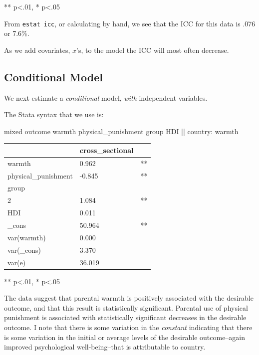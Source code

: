 \documentclass[
  letterpaper,
  DIV=11,
  numbers=noendperiod]{scrreprt}
\newenvironment{Shaded}{\begin{snugshade}}{\end{snugshade}}
\newcommand{\FunctionTok}[1]{\textcolor[rgb]{0.28,0.35,0.67}{#1}}
\newcommand{\NormalTok}[1]{\textcolor[rgb]{0.00,0.23,0.31}{#1}}
\begin{document}
** p\textless.01, * p\textless.05

From \texttt{estat\ icc}, or calculating by hand, we see that the ICC
for this data is .076 or 7.6\%.

As we add covariates, \(x\)'s, to the model the ICC will most often
decrease.

\subsection{Conditional Model}\label{conditional-model}

We next estimate a \emph{conditional} model, \emph{with} independent
variables.

The Stata syntax that we use is:

\begin{Shaded}
\begin{Highlighting}[]

\NormalTok{mixed outcome warmth physical\_punishment }\FunctionTok{group}\NormalTok{ HDI || country: warmth}
\end{Highlighting}
\end{Shaded}

\begin{longtable}[]{@{}lll@{}}
\toprule\noalign{}
& cross\_sectional & \\
\midrule\noalign{}
\endhead
\bottomrule\noalign{}
\endlastfoot
warmth & 0.962 & ** \\
physical\_punishment & -0.845 & ** \\
group & & \\
2 & 1.084 & ** \\
HDI & 0.011 & \\
\_cons & 50.964 & ** \\
var(warmth) & 0.000 & \\
var(\_cons) & 3.370 & \\
var(e) & 36.019 & \\
\end{longtable}

** p\textless.01, * p\textless.05

The data suggest that parental warmth is positively associated with the
desirable outcome, and that this result is statistically significant.
Parental use of physical punishment is associated with statistically
significant decreases in the desirable outcome. I note that there is
some variation in the \emph{constant} indicating that there is some
variation in the initial or average levels of the desirable
outcome--again improved psychological well-being--that is attributable
to country.
\end{document}
